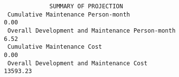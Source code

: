 \documentclass[11pt,a4paper,spanish,twoside]{report}
\begin{document}
{\begin{verbatim}
             SUMMARY OF PROJECTION
 Cumulative Maintenance Person-month                                 0.00
 Overall Development and Maintenance Person-month                    6.52
 Cumulative Maintenance Cost                                         0.00
 Overall Development and Maintenance Cost                        13593.23
\end{verbatim}
}
\end{document}
